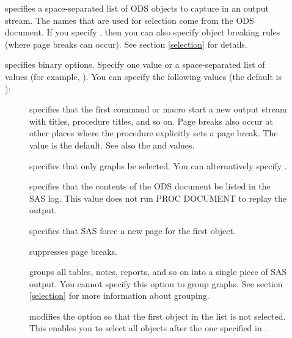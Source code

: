 \documentclass[article,oneside]{memoir}
\begin{document}
\begin{description}
  \item[] specifies a space-separated list of ODS objects to capture
  in an output stream.
  The names that are used for selection come from the ODS document.
  If you specify , then you can also specify object breaking rules
  (where page breaks can occur). See section \ref{selection} for details.

  \item[] specifies binary options.  Specify one value or a space-separated
  list of values (for example, ).
  You can specify the following values (the default is ):

  \begin{description}
  \item[] specifies that the first 
  command or  macro start a new output stream with
  titles, procedure titles, and so on.
  Page breaks also occur at other places where the procedure
  explicitly sets a page break. The  value is the default.
  See also the  and  values.

 \item[] specifies that only graphs be selected.
  You can alternatively specify .

  \item[] specifies that the contents of the ODS document be listed
  in the SAS log. This value does not run PROC DOCUMENT to replay the output.

  \item[] specifies that SAS force a new page for the first object.

  \item[] suppresses page breaks.

  \item[] groups all tables, notes, reports, and so on into a
  single piece of SAS output. You cannot specify this option to group graphs.
  See section \ref{selection} for more information about grouping.

  \item[] modifies the  option so that the first object in the
  list is not selected. This enables you to select all objects after the one
  specified in .


\end{description}
\end{description}
\end{document}
